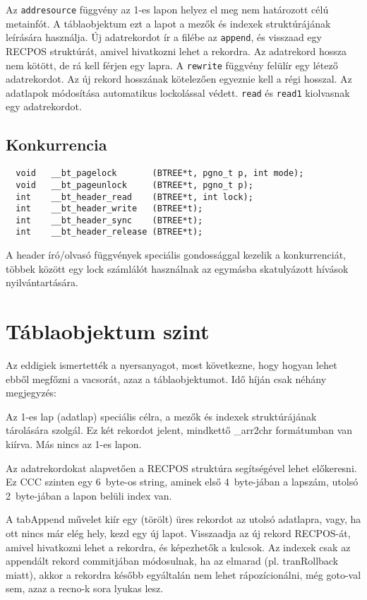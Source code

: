 Az \verb!addresource! függvény az 1-es lapon helyez el meg nem 
határozott célú metainfót. A táblaobjektum ezt a lapot a mezők
és indexek struktúrájának leírására használja.
Új adatrekordot ír a filébe az \verb!append!, és visszaad egy
RECPOS struktúrát, amivel hivatkozni lehet a rekordra.
Az adatrekord hossza nem kötött, de rá kell férjen egy lapra.
A \verb!rewrite! függvény felülír egy létező adatrekordot.
Az új rekord hosszának kötelezően egyeznie kell a régi hosszal.
Az adatlapok módosítása automatikus lockolással védett.
\verb!read! és \verb!read1! kiolvasnak egy adatrekordot.
 

\subsection{Konkurrencia}

\begin{verbatim}
  void   __bt_pagelock       (BTREE*t, pgno_t p, int mode);
  void   __bt_pageunlock     (BTREE*t, pgno_t p);
  int    __bt_header_read    (BTREE*t, int lock);
  int    __bt_header_write   (BTREE*t);
  int    __bt_header_sync    (BTREE*t);
  int    __bt_header_release (BTREE*t);
\end{verbatim}

A header író/olvasó függvények speciális gondossággal
kezelik a konkurrenciát, többek között egy lock számlálót
használnak az egymásba skatulyázott hívások nyilvántartására.
 

\section{Táblaobjektum szint}

Az eddigiek ismertették a nyersanyagot, most következne,
hogy hogyan lehet ebből megfőzni a vacsorát, azaz a táblaobjektumot.
Idő híján csak néhány megjegyzés:

Az 1-es lap (adatlap) speciális célra, a mezők és indexek
struktúrájának tárolására szolgál. Ez két rekordot jelent,
mindkettő \_arr2chr formátumban van kiírva.  
Más nincs az 1-es lapon.

Az adatrekordokat alapvetően a RECPOS struktúra segítségével lehet
előkeresni. Ez CCC szinten egy 6~byte-os string, aminek első 4~byte-jában
a lapszám, utolsó 2~byte-jában a lapon belüli index van.

A tabAppend művelet kiír egy (törölt) üres rekordot az utolsó adatlapra,
vagy, ha ott nincs már elég hely, kezd egy új lapot. Visszaadja
az új rekord RECPOS-át, amivel hivatkozni lehet a rekordra,
és képezhetők a kulcsok. Az indexek csak az appendált rekord 
commitjában módosulnak, ha az elmarad (pl.{} tranRollback miatt),
akkor a rekordra később egyáltalán nem lehet rápozícionálni,
még goto-val sem, azaz a recno-k sora lyukas lesz.


